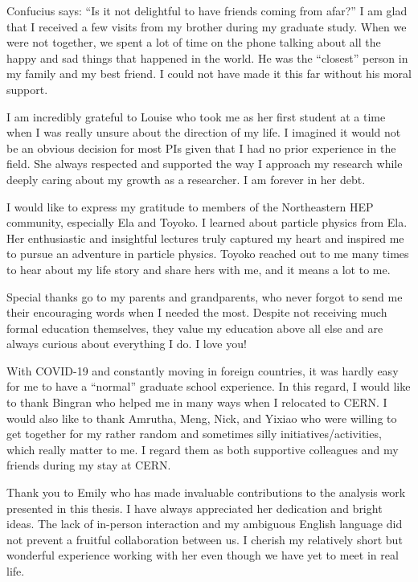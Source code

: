 \begin{acknowledgments}

Confucius says: ``Is it not delightful to have friends coming from afar?'' I am glad that I received a few visits from my brother during my graduate study. When we were not together, we spent a lot of time on the phone talking about all the happy and sad things that happened in the world. He was the ``closest'' person in my family and my best friend. I could not have made it this far without his moral support.

I am incredibly grateful to Louise who took me as her first student at a time when I was really unsure about the direction of my life. I imagined it would not be an obvious decision for most PIs given that I had no prior experience in the field. She always respected and supported the way I approach my research while deeply caring about my growth as a researcher. I am forever in her debt.  

I would like to express my gratitude to members of the Northeastern HEP community, especially Ela and Toyoko. I learned about particle physics from Ela. Her enthusiastic and insightful lectures truly captured my heart and inspired me to pursue an adventure in particle physics. Toyoko reached out to me many times to hear about my life story and share hers with me, and it means a lot to me.

Special thanks go to my parents and grandparents, who never forgot to send me their encouraging words when I needed the most. Despite not receiving much formal education themselves, they value my education above all else and are always curious about everything I do. I love you!

With COVID-19 and constantly moving in foreign countries, it was hardly easy for me to have a ``normal'' graduate school experience. In this regard, I would like to thank Bingran who helped me in many ways when I relocated to CERN. I would also like to thank Amrutha, Meng, Nick, and Yixiao who were willing to get together for my rather random and sometimes silly initiatives/activities, which really matter to me. I regard them as both supportive colleagues and my friends during my stay at CERN.

Thank you to Emily who has made invaluable contributions to the analysis work presented in this thesis. I have always appreciated her dedication and bright ideas. The lack of in-person interaction and my ambiguous English language did not prevent a fruitful collaboration between us. I cherish my relatively short but wonderful experience working with her even though we have yet to meet in real life.

\end{acknowledgments}